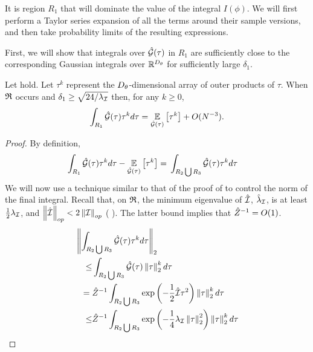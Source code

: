 It is region $R_1$ that will dominate the value of the integral $I(\phi)$.  We
will first perform a Taylor series expansion of all the terms around their
sample versions, and then take probability limits of the resulting expressions.

First, we will show that integrals over $\hat{\mathcal{G}}(\tau)$ in $R_1$ are sufficiently
close to the corresponding Gaussian integrals over $\mathbb{R}^{D_\theta}$ for
sufficiently large $\delta_1$.


\begin{lem}
%
Let  hold.  Let $\tau^k$ represent the
$D_\theta$-dimensional array of outer products of $\tau$.  When $\mathfrak{R}$ occurs and
$\delta_1 \ge \sqrt{24 / \lambda_\mathcal{I}}$ then, for any $k \ge 0$,
%
\begin{align*}
%
\int_{R_1} \normhatarg{\tau} \tau^k d\tau =
    \expect{\normhat}{\tau^k} + O(N^{-3}).
%
\end{align*}
%
\begin{proof}
%
By definition,
%
\begin{align*}
%
\int_{R_1} \normhatarg{\tau} \tau^k d\tau  - \expect{\normhat}{\tau^k}
={}&
\int_{R_2 \bigcup R_3} \normhatarg{\tau} \tau^k d\tau
%
\end{align*}
%
We will now use a technique similar to that of the proof of
 to control the norm of the final integral.
Recall that, on $\mathfrak{R}$, the minimum eigenvalue of $\hat{\mathcal{I}}$, $\hat{\lambda}_\mathcal{I}$,
is at least $\frac{1}{2} \lambda_\mathcal{I}$, and $\left\Vert \hat{\mathcal{I}}\right\Vert_{op} < 2 \left\Vert \mathcal{I}\right\Vert_{op}$
( ). The latter bound implies that
$\hat{Z}^{-1} = O(1)$.
%
\begin{align*}
%
\MoveEqLeft
\norm{
    \int_{R_2 \bigcup R_3}
            \normhatarg{\tau} \tau^k d\tau
}_2
\\\le&
    \int_{R_2 \bigcup R_3}
            \normhatarg{\tau} \norm{\tau}^k_2 d\tau
\\={}&
\normalizer^{-1} \int_{R_2 \bigcup R_3}
        \exp\left(-\frac{1}{2} \infohat \tau^2 \right)
            \norm{\tau}^k_2 d\tau
\\\le&
\normalizer^{-1} \int_{R_2 \bigcup R_3}
        \exp\left(-\frac{1}{4} \infoev \norm{\tau}_2^2 \right)
            \norm{\tau}^k_2 d\tau

\end{align*}
\end{proof}
\end{lem}
